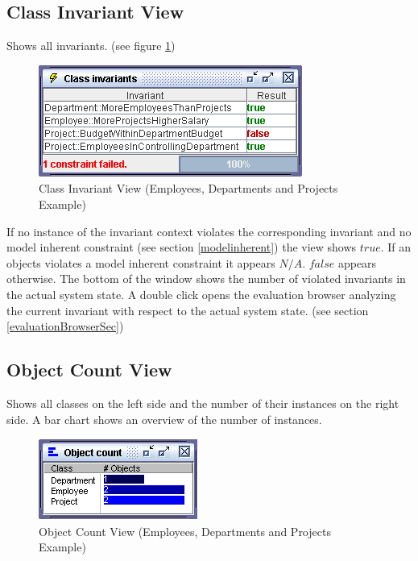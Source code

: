 \documentclass[a4paper,titlepage,oneside,final]{scrreprt} %
\begin{document}
\subsection{Class Invariant View}\label{classinvariantview}
Shows all invariants. (see figure \ref{fig:ClassInvariantView})
\begin{figure}[ht]
\centering
\includegraphics[scale=0.7]{Screenshots/GUI/Views/ClassInvariantView.png}
\caption{Class Invariant View (Employees, Departments and Projects Example)}
\label{fig:ClassInvariantView}
\end{figure}
If no instance of the invariant context
violates the corresponding invariant and no model inherent constraint
(see section \ref{modelinherent}) the view shows $\mathit{true}$.
If an objects violates a model inherent constraint it appears $N/A$.
$\mathit{false}$ appears otherwise.
The bottom of the window shows the number of violated invariants
in the actual system state. %
A double click opens the evaluation browser analyzing the current invariant
with respect to the actual system state. (see section \ref{evaluationBrowserSec})
\subsection{Object Count View}\label{objectcountview}
Shows all classes on the left side and the number of their instances
on the right side. A bar chart shows an overview of the number of instances.
\begin{figure}[ht]
\centering
\includegraphics[scale=0.7]{Screenshots/GUI/Views/ObjectCountView.png}
\caption{Object Count View (Employees, Departments and Projects Example)}
\label{fig:ObjectCountView}
\end{figure}
\end{document}
